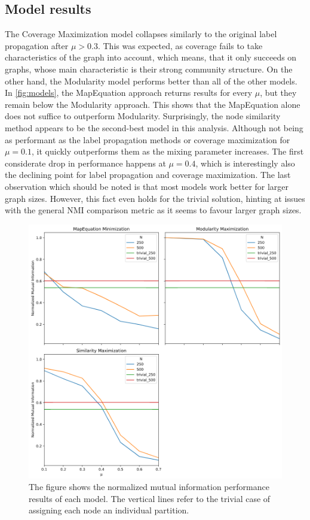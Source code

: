 \documentclass[11pt, twocolumn]{article}
\begin{document}
\subsection{Model results}
The Coverage Maximization model collapses similarly to the original label propagation after $\mu>0.3$. This was expected, as coverage fails to take characteristics of the graph into account, which means, that it only succeeds on graphs, whose main characteristic is their strong community structure. On the other hand, the Modularity model performs better than all of the other models. In \autoref{fig:models}, the MapEquation approach returns results for every $\mu$, but they remain below the Modularity approach. This shows that the MapEquation alone does not suffice to outperform Modularity. Surprisingly, the node similarity method appears to be the second-best model in this analysis. Although not being as performant as the label propagation methods or coverage maximization for $\mu=0.1$, it quickly outperforms them as the mixing parameter increases. The first considerate drop in performance happens at $\mu=0.4$, which is interestingly also the declining point for label propagation and coverage maximization. The last observation which should be noted is that most models work better for larger graph sizes. However, this fact even holds for the trivial solution, hinting at issues with the general NMI comparison metric as it seems to favour larger graph sizes.

\begin{figure}[h]
  \includegraphics[width=\linewidth]{models.png}
  \caption{The figure shows the normalized mutual information performance results of each model. The vertical lines refer to the trivial case of assigning each node an individual partition.}
  \label{fig:models}
\end{figure}
\end{document}
